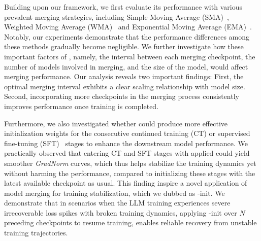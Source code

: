 Building upon our \OURS{} framework, we first evaluate its performance with various prevalent merging strategies, including Simple Moving Average (SMA)~\cite{johnston1999some}, Weighted Moving Average (WMA)~\cite{perry2010weighted} and Exponential Moving Average (EMA)~\cite{hunter1986exponentially}.
Notably, our experiments demonstrate that the performance differences among these methods gradually become negligible.
We further investigate how these important factors of \OURS{}, namely, the interval between each merging checkpoint, the number of models involved in merging, and the size of the model, would affect merging performance.
Our analysis reveals two important findings:
First, the optimal merging interval exhibits a clear scaling relationship with model size.
Second, incorporating more checkpoints in the merging process consistently improves performance once training is completed.

Furthermore, we also investigated whether \OURS{} could produce more effective initialization weights for the consecutive continued training (CT) or supervised fine-tuning (SFT)~\cite{wei2021finetuned} stages to enhance the downstream model performance.
We practically observed that entering CT and SFT stages with \OURS{} applied could yield smoother \textit{GradNorm} curves, which thus helps stabilize the training dynamics yet without harming the performance, compared to initializing these stages with the latest available checkpoint as usual.
This finding inspire a novel application of model merging for training stabilization, which we dubbed as \OURS{}-init.
We demonstrate that in scenarios when the LLM training experiences severe irrecoverable loss spikes with broken training dynamics,
applying \OURS{}-init over \(N\) preceding checkpoints to resume training, enables reliable recovery from unstable training trajectories.

